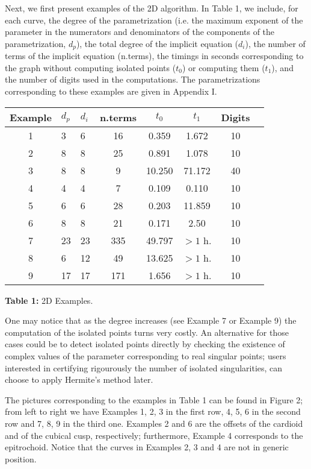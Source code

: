 \documentclass{elsart}
\begin{document}
Next, we first present examples of the 2D algorithm. In Table 1, we include, for each curve, the degree of the
parametrization (i.e. the maximum exponent of the parameter in the
numerators and denominators of the components of the
parametrization, $d_p$), the total degree of the implicit equation
($d_i$), the number of terms of the implicit equation (n.terms),
 the
timings in seconds corresponding to the graph without computing isolated
points ($t_0$) or computing them ($t_1$), and the number of digits
used in the computations. The parametrizations corresponding to
these examples are given in Appendix I.

\begin{center}
\begin{tabular}{|c|l|l|c|c|c|c|c|} \hline
Example & $d_p$ & $d_i$ & n.terms  & $t_0$ & $t_1$ & Digits  \\
\hline \hline 1 & 3 & 6 & 16  & 0.359 & 1.672 & 10  \\
\hline 2 & 8 & 8 & 25  & 0.891 & 1.078 & 10  \\
\hline 3 & 8 & 8 & 9  & 10.250 & 71.172 & 40  \\
\hline 4 & 4 & 4 & 7  & 0.109 & 0.110 & 10 \\
\hline 5 & 6 & 6 & 28  & 0.203 & 11.859 & 10 \\
\hline 6 & 8 & 8 & 21  & 0.171 & 2.50 & 10 \\
\hline 7 & 23 & 23 & 335  & 49.797 & $> 1$ h. & 10 \\
\hline 8 & 6 & 12 & 49  & 13.625 & $> 1$ h. & 10 \\
\hline 9 & 17 & 17 & 171  & 1.656 & $> 1$ h. & 10 \\
\hline
\end{tabular}

{\bf Table 1:} 2D Examples.
\end{center}


One may notice that as the degree increases (see Example 7 or
Example 9) the computation of the isolated points turns very
costly. An alternative for those cases could be to detect isolated
points directly by checking the existence of complex values of the
parameter corresponding to real singular points; users interested in certifying
rigourously the number of isolated singularities, can choose to apply
Hermite's method later.

The pictures corresponding to the examples in Table 1 can be found
in Figure 2; from left to right we have Examples 1, 2, 3 in the
first row, 4, 5, 6 in the second row and 7, 8, 9 in the third one.
Examples 2 and 6 are the offsets of the cardioid and of the
cubical cusp, respectively; furthermore, Example 4 corresponds to
the epitrochoid. Notice that the curves in Examples 2, 3 and 4 are
not
in generic position.
\end{document}
